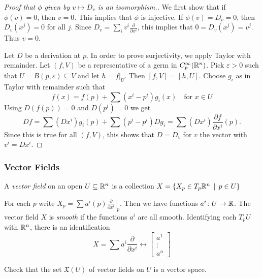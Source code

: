 \begin{frame}
  \begin{proof}[Proof that $\phi$ given by $v \mapsto D_v$ is  an isomorphism.]
    We first show that if $\phi(v) = 0$, then $v = 0$. This implies that
    $\phi$ is injective. If $\phi(v) = D_v = 0$, then $D_v(x^j) = 0$ 
    for all $j$. Since $D_v = \sum_i v^i \frac{\partial}{\partial x^i}$, this
    implies that $0 = D_v(x^j) = v^j$. Thus $v = 0$.

    Let $D$ be a derivation at $p$.
    In order to prove surjectivity, we apply Taylor with remainder.
    Let $(f, V)$ be a representative of a germ in $C^{\infty}_p(\mathbb R^n)$. 
    Pick $\varepsilon > 0$ such that $U = B(p, \varepsilon) \subseteq V$
    and let $h = f|_{U}$. Then $[f, V] = [h, U]$.
    Choose $g_i$ as in Taylor with remainder such that
    \begin{displaymath}
      f(x) = f(p) + \sum (x^i - p^i) g_i(x) \quad \text{for $x \in U$}
    \end{displaymath}
    Using $D(f(p)) = 0$ and $D(p^i) = 0$ we get
    \begin{displaymath}
      Df = \sum (Dx^i)g_i(p) + \sum (p^i - p^i)Dg_i = 
      \sum (Dx^i) \frac{\partial f}{\partial x^i}(p).
    \end{displaymath}
    Since this is true for all $(f, V)$, this shows that $D = D_v$ for 
    $v$ the vector with $v^i = Dx^i$.
  \end{proof}
\end{frame}

\begin{frame}
  \frametitle{Vector Fields}
  \begin{definition}
    A {\em vector field} on an open $U \subseteq \mathbb R^n$ is a collection
    $X = \{X_p \in T_p\mathbb R^n \, \mid \, p \in U\}$
  \end{definition}
  For each $p$ write $X_p = \sum a^i(p) \left. \frac{\partial }{\partial
  x^i}\right\rvert_p$. Then we have functions $a^i \colon U \to \mathbb R$.
  The vector field $X$ is {\em smooth} if the functions $a^i$ are all smooth.
  Identifying each $T_p U$ with $\mathbb R^n$, there is an identification
  \begin{displaymath}
    X = \sum a^i \frac{\partial}{\partial x^i} \longleftrightarrow 
    \begin{bmatrix}
      a^1 \\ \vdots \\ a^n
    \end{bmatrix}
  \end{displaymath}
  \begin{exercise}
    Check that the set $\mathfrak{X}(U)$ of vector fields on $U$ is a vector
    space.
  \end{exercise}
\end{frame}

